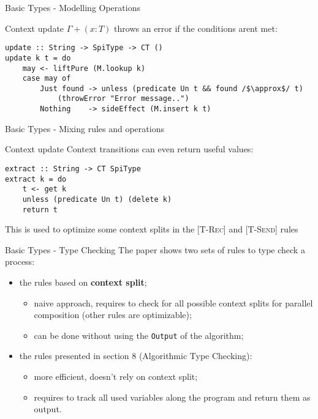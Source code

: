 \begin{frame}[fragile]{Basic Types - Modelling Operations}

    \begin{exampleblock}{Context update}
        $\Gamma + (x : T)$ throws an error if the conditions arent met:
        \small\begin{verbatim}
update :: String -> SpiType -> CT ()
update k t = do
    may <- liftPure (M.lookup k)
    case may of
        Just found -> unless (predicate Un t && found /$\approx$/ t) 
            (throwError "Error message..")
        Nothing    -> sideEffect (M.insert k t)
        \end{verbatim}
    \end{exampleblock}
    
\end{frame}


\begin{frame}[fragile]{Basic Types - Mixing rules and operations}

    \begin{exampleblock}{Context update}
        Context transitions can even return useful values:
        \small\begin{verbatim}
extract :: String -> CT SpiType
extract k = do
    t <- get k
    unless (predicate Un t) (delete k)
    return t
        \end{verbatim}
    \end{exampleblock}

    This is used to optimize some context splits in the [\textsc{T-Rec}] and [\textsc{T-Send}] rules

\end{frame}

\begin{frame}{Basic Types - Type Checking}
    The paper shows two sets of rules to type check a process:
    \begin{itemize}
        \item the rules based on \textbf{context split};
        \begin{itemize}
            \item naive approach, requires to check for all possible context splits for parallel composition (other rules are optimizable);
            \item can be done without using the \texttt{Output} of the algorithm;
        \end{itemize}
        \item the rules presented in section 8 (Algorithmic Type Checking):
        \begin{itemize}
            \item more efficient, doesn't rely on context split;
            \item requires to track all used variables along the program and return them as output.
        \end{itemize}
    \end{itemize}
\end{frame}

